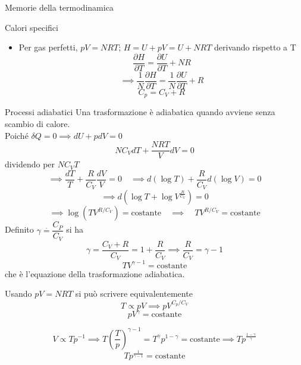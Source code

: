 \documentclass[a4paper,11pt]{report}
\newcommand{\defeq}{\overset{\cdot}{=}}
\begin{document}
\begin{chapter}{Memorie della termodinamica}
\begin{section}{Calori specifici}
\begin{itemize}
			\item Per gas perfetti, $pV = NRT$; $ H= U+pV = U + NRT$
			derivando rispetto a T
			$$
			\dfrac{\partial H}{\partial T} = \dfrac{\partial U}{\partial T} + NR
			$$
			$$
			\implies \dfrac{1}{N} \dfrac{\partial H}{\partial T} = \dfrac{1}{N}\dfrac{\partial U}{\partial T} + R
			$$
			$$
			C_p = C_V + R
			$$
		\end{itemize}		
	\end{section}
	\begin{section}{Processi adiabatici}
		Una trasformazione è adiabatica quando avviene senza scambio di calore.\\
		Poiché $\delta Q =0 \implies dU + pdV =0$
		$$
		NC_VdT + \dfrac{NRT}{V}dV = 0
		$$
		dividendo per $NC_VT$
		$$
		\implies \dfrac{dT}{T} + \dfrac{R}{C_V} \dfrac{dV}{V}=0 \quad 
		\implies d\left(\log T\right) +  \dfrac{R}{C_V} d(\log V) = 0
		$$
		$$
		\implies d\left(\log T + \log V^{ \frac{R}{C_V}}\right) = 0
		$$
		$$
		\implies \log(TV^{R/C_V}) = \mathrm{costante} 
		\quad \implies \quad TV^{R/C_V} = \textrm{costante}
		$$
		Definito $\gamma \defeq \dfrac{C_P}{C_V}$ si ha
		$$
		\gamma = \dfrac{C_V + R}{C_V} = 1 + \dfrac{R}{C_V} \implies \dfrac{R}{C_V} = \gamma -1
		$$
		\begin{equation}
			TV^{\gamma -1} = \mathrm{costante}
		\end{equation}
		che è l'equazione della trasformazione adiabatica.
		
		Usando $pV = NRT$ si può scrivere equivalentemente
		$$
		T \propto pV \implies pV^{C_p/C_V}
		$$
		\begin{equation}
			pV^{\gamma} = \mathrm{costante}
		\end{equation}
		
		$$
		V\propto Tp^{-1} \implies T\left(\dfrac{T}{p}\right)^{\gamma-1} = T^{\gamma}p^{1-\gamma} = \textrm{costante} \implies Tp^{\frac{1-\gamma}{\gamma}}
		$$
		\begin{equation}
		Tp^{\frac{1}{\gamma -1}} = \mathrm{costante}
		\end{equation}
		
	\end{section}
	
	\end{chapter}
\end{document}

